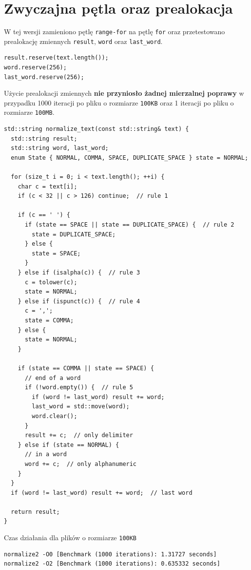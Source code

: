 \documentclass[12pt]{article}
\begin{document}
\section*{Zwyczajna pętla oraz prealokacja}
W tej wersji zamieniono pętlę \verb|range-for| na pętlę \verb|for| oraz przetestowano
prealokację zmiennych \verb|result|, \verb|word| oraz \verb|last_word|. \\
\begin{verbatim}
result.reserve(text.length());
word.reserve(256);
last_word.reserve(256);
\end{verbatim}
Użycie prealokacji zmiennych \textbf{nie przyniosło żadnej mierzalnej poprawy} w przypadku 
1000 iteracji po pliku o rozmiarze \verb|100KB| oraz 1 iteracji po pliku o rozmiarze
\verb|100MB|. \\

\begin{verbatim}
std::string normalize_text(const std::string& text) {
  std::string result;
  std::string word, last_word;
  enum State { NORMAL, COMMA, SPACE, DUPLICATE_SPACE } state = NORMAL;

  for (size_t i = 0; i < text.length(); ++i) {
    char c = text[i];
    if (c < 32 || c > 126) continue;  // rule 1

    if (c == ' ') {
      if (state == SPACE || state == DUPLICATE_SPACE) {  // rule 2
        state = DUPLICATE_SPACE;
      } else {
        state = SPACE;
      }
    } else if (isalpha(c)) {  // rule 3
      c = tolower(c);
      state = NORMAL;
    } else if (ispunct(c)) {  // rule 4
      c = ',';
      state = COMMA;
    } else {
      state = NORMAL;
    }

    if (state == COMMA || state == SPACE) {
      // end of a word
      if (!word.empty()) {  // rule 5
        if (word != last_word) result += word;
        last_word = std::move(word);
        word.clear();
      }
      result += c;  // only delimiter
    } else if (state == NORMAL) {
      // in a word
      word += c;  // only alphanumeric
    }
  }
  if (word != last_word) result += word;  // last word

  return result;
}
\end{verbatim}

Czas działania dla plików o rozmiarze \verb|100KB|
\begin{verbatim}
normalize2 -O0 [Benchmark (1000 iterations): 1.31727 seconds]
normalize2 -O2 [Benchmark (1000 iterations): 0.635332 seconds]
\end{verbatim}
\end{document}
